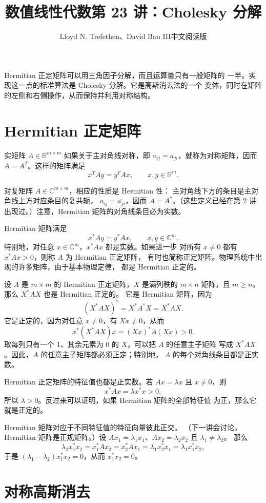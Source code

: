 \documentclass[UTF8,fontset=none,12pt]{ctexart}
\title{数值线性代数\quad 第 23 讲：Cholesky 分解}
\author{Lloyd N. Trefethen、David Bau III\quad 中文阅读版}
\date{}
\begin{document}
\maketitle
\pagestyle{plain}

Hermitian 正定矩阵可以用三角因子分解，而且运算量只有一般矩阵的
一半。实现这一点的标准算法是 Cholesky 分解。它是高斯消去法的一个
变体，同时在矩阵的左侧和右侧操作，从而保持并利用对称结构。

\section*{Hermitian 正定矩阵}

实矩阵 $A\in\mathbb{R}^{m\times m}$ 如果关于主对角线对称，即
$a_{ij}=a_{ji}$，就称为对称矩阵，因而 $A=A^T$。这样的矩阵满足
\[
x^TAy=y^TAx,\qquad x,y\in\mathbb{R}^m.
\]

对复矩阵 $A\in\mathbb{C}^{m\times m}$，相应的性质是 Hermitian 性：
主对角线下方的条目是主对角线上方对应条目的复共轭，
$a_{ij}=\overline{a_{ji}}$，因而 $A=A^*$。（这些定义已经在第 2 讲
出现过。）注意，Hermitian 矩阵的对角线条目必为实数。

Hermitian 矩阵满足
\[
x^*Ay=y^*Ax,\qquad x,y\in\mathbb{C}^m.
\]
特别地，对任意 $x\in\mathbb{C}^m$，$x^*Ax$ 都是实数。如果进一步
对所有 $x\ne0$ 都有 $x^*Ax>0$，则称 $A$ 为 Hermitian 正定矩阵，
有时也简称正定矩阵。物理系统中出现的许多矩阵，由于基本物理定律，
都是 Hermitian 正定的。

设 $A$ 是 $m\times m$ 的 Hermitian 正定矩阵，$X$ 是满列秩的
$m\times n$ 矩阵，且 $m\ge n$。那么 $X^*AX$ 也是 Hermitian 正定的。
它是 Hermitian 矩阵，因为
\[
(X^*AX)^*=X^*A^*X=X^*AX.
\]
它是正定的，因为对任意 $x\ne0$，有 $Xx\ne0$，从而
\[
x^*(X^*AX)x=(Xx)^*A(Xx)>0.
\]
取每列只有一个 1、其余元素为 0 的 $X$，可以把 $A$ 的任意主子矩阵
写成 $X^*AX$。因此，$A$ 的任意主子矩阵都必须正定；特别地，
$A$ 的每个对角线条目都是正实数。

Hermitian 正定矩阵的特征值也都是正实数。若
$Ax=\lambda x$ 且 $x\ne0$，则
\[
x^*Ax=\lambda x^*x>0,
\]
所以 $\lambda>0$。反过来可以证明，如果 Hermitian 矩阵的全部特征值
为正，那么它就是正定的。

Hermitian 矩阵对应于不同特征值的特征向量彼此正交。
（下一讲会讨论，Hermitian 矩阵是正规矩阵。）设
$Ax_1=\lambda_1x_1$、$Ax_2=\lambda_2x_2$ 且 $\lambda_1\ne\lambda_2$。
那么
\[
\lambda_2x_1^*x_2=x_1^*Ax_2=x_2^*Ax_1
=\overline{\lambda_1}x_2^*x_1=\lambda_1x_1^*x_2,
\]
于是 $(\lambda_1-\lambda_2)x_1^*x_2=0$，从而
$x_1^*x_2=0$。

\section*{对称高斯消去}
\end{document}
